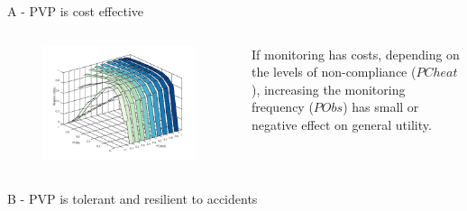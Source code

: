\documentclass[xcolor={table}]{beamer}
\begin{document}
\begin{frame}[fragile=singleslide,t]
\begin{columns}[T]
\begin{column}{.47\textwidth}
\begin{block}{A - PVP is cost effective}
\begin{columns}[T]
\begin{column}{.7\textwidth}
\begin{figure}%
  \centering
  \includegraphics[width=1.0\linewidth]{img/exp1a.png}%
  \label{respobs}
\end{figure}

\end{column}
\begin{column}{.3\textwidth}

If monitoring has costs, depending on the levels of non-compliance ($PCheat$), increasing the monitoring frequency ($PObs$) has small or negative effect on general utility.

\end{column}
\end{columns}
\end{block}


\begin{block}{B - PVP is tolerant and resilient to accidents}

\begin{columns}[T]
\begin{column}{.7\textwidth}


\end{column}
\end{columns}
\end{block}
\end{column}
\end{columns}
\end{frame}
\end{document}
